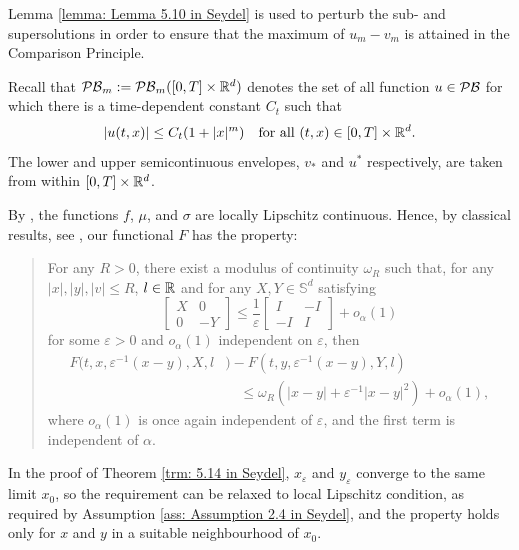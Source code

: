Lemma \ref{lemma: Lemma 5.10 in Seydel} is used to perturb the sub- and supersolutions in order to ensure that the maximum of $u_m - v_m$ is attained in the Comparison Principle.

Recall that $\mathcal{PB}_m:=\mathcal{PB}_m ([0,T] \times \mathbb{R}^d)$ denotes the set of all function $u \in \mathcal{PB}$ for which there is a time-dependent constant $C_t$ such that
\begin{equation*}
    |u(t,x)| \leq C_t (1+|x|^m) \quad \text{for all } (t,x) \in [0,T]\times \mathbb{R}^d.
\end{equation*}
The lower and upper semicontinuous envelopes, $v_*$ and $u^*$ respectively, are taken from within $[0,T] \times \mathbb{R}^d$. 

By , the functions $f$, $\mu$, and $\sigma$ are locally Lipschitz continuous. Hence, by classical results, see {\cite[Lemma V.7.1]{fleming2006controlled}}, our functional $F$ has the property:
\begin{quote}
    For any $R>0$, there exist a modulus of continuity $\omega_R$ such that, for any $|x|,|y|,|v| \leq R$, $l \in \mathbb{R}$ and for any $X,Y \in \mathbb S^d$ satisfying 
    \begin{equation*}
        \begin{bmatrix}
            X & 0\\
            0 & -Y
        \end{bmatrix}
        \leq 
        \frac 1 \varepsilon
        \begin{bmatrix}
            I & -I\\
            -I & I
        \end{bmatrix}
        + o_\alpha(1)
    \end{equation*} 
    for some $\varepsilon > 0$ and $o_\alpha(1)$ independent on $\varepsilon$, then
    \begin{align*}
        F(t,x,\varepsilon^{-1} (x-y), X, l&) - F(t,y,\varepsilon^{-1} (x-y), Y, l) \\
        &\quad \leq \omega_R (|x-y| + \varepsilon^{-1} |x-y|^2) + o_\alpha(1),
    \end{align*}
    where $o_\alpha(1)$ is once again independent of $\varepsilon$, and the first term is independent of $\alpha$. 
\end{quote}
In the proof of Theorem \ref{trm: 5.14 in Seydel}, $x_\varepsilon$ and $y_\varepsilon$ converge to the same limit $x_0$, so the requirement can be relaxed to local Lipschitz condition, as required by Assumption \ref{ass: Assumption 2.4 in Seydel}, and the property holds only for $x$ and $y$ in a suitable neighbourhood of $x_0$. 

